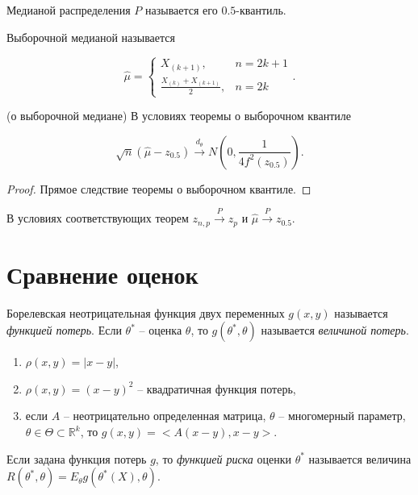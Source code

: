 \begin{definition}
    Медианой распределения $\displaystyle P$ называется его $\displaystyle 0.5$-квантиль.
    \end{definition}
    \begin{definition}
    Выборочной медианой называется
    
    
    \begin{equation*}
    \hat{\mu } =\begin{cases}
    X_{( k+1)} , & n=2k+1\\
    \frac{X_{( k)} +X_{( k+1)}}{2} , & n=2k
    \end{cases} .
    \end{equation*}
    \end{definition}
    \begin{theorem}
    (о выборочной медиане) В условиях теоремы о выборочном квантиле
    
    
    \begin{equation*}
    \sqrt{n}(\hat{\mu } -z_{0.5})\xrightarrow{d_{\theta }} N\left( 0,\frac{1}{4f^{2}( z_{0.5})}\right) .
    \end{equation*}
    \end{theorem}
    \begin{proof}
    Прямое следствие теоремы о выборочном квантиле.
    \end{proof}
    \begin{note}
    В условиях соответствующих теорем $\displaystyle z_{n,p}\xrightarrow{P} z_{p}$ и $\displaystyle \hat{\mu }\xrightarrow{P} z_{0.5}$.
    \end{note}
    \section{Сравнение оценок}
    \begin{definition}
    Борелевская неотрицательная функция двух переменных $\displaystyle g( x,y)$ называется \textit{функцией потерь}. Если $\displaystyle \theta ^{*}$ -- оценка $\displaystyle \theta $, то $\displaystyle g\left( \theta ^{*} ,\theta \right)$ называется \textit{величиной потерь}.
    \end{definition}
    \begin{example}
    \begin{enumerate}\
        \item $\displaystyle \rho ( x,y) =| x-y| $,
        \item $\displaystyle \rho ( x,y) =( x-y)^{2}$ -- квадратичная функция потерь,
        \item если $\displaystyle A$ -- неотрицательно определенная матрица, $\displaystyle \theta $ -- многомерный параметр, $\displaystyle \theta \in \Theta \subset \mathbb{R}^{k}$, то $\displaystyle g( x,y) =< A( x-y) ,x-y> $.
    \end{enumerate}
    
    \end{example}
    \begin{definition}
    Если задана функция потерь $\displaystyle g$, то \textit{функцией риска} оценки $\displaystyle \theta ^{*}$ называется величина $\displaystyle R\left( \theta ^{*} ,\theta \right) =E_{\theta } g\left( \theta ^{*}( X) ,\theta \right)$.
    \end{definition}
